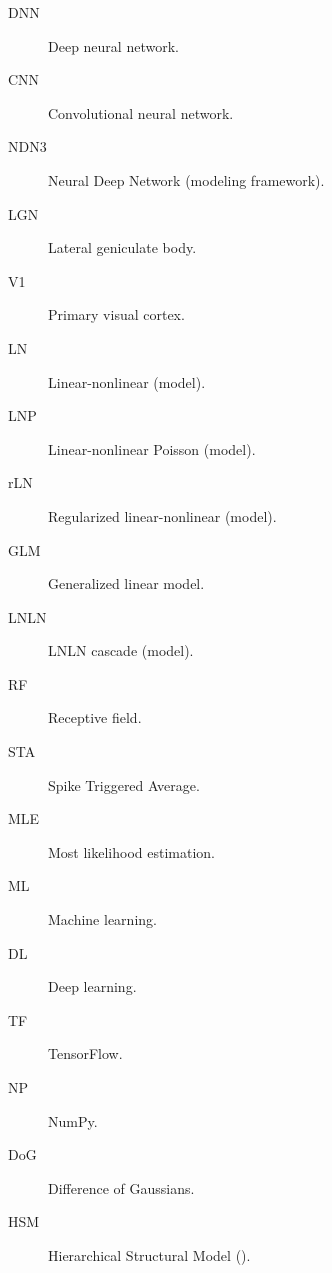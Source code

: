 
\begin{description}
	
	\item[DNN] Deep neural network.
	
	\item[CNN] Convolutional neural network.
	
	\item[NDN3] Neural Deep Network (modeling framework).
	
	\item[LGN] Lateral geniculate body.
	
	\item[V1] Primary visual cortex.
	
	\item[LN] Linear-nonlinear (model).
	
	\item[LNP] Linear-nonlinear Poisson (model).

	\item[rLN] Regularized linear-nonlinear (model).

	\item[GLM] Generalized linear model.

	\item[LNLN] LNLN cascade (model).

	\item[RF] Receptive field.

	\item[STA] Spike Triggered Average.

	\item[MLE] Most likelihood estimation.

	\item[ML] Machine learning.

	\item[DL] Deep learning.

	\item[TF] TensorFlow.

	\item[NP] NumPy.

	\item[DoG] Difference of Gaussians.

	\item[HSM] Hierarchical Structural Model (\citep{antolik}).
	
\end{description}

